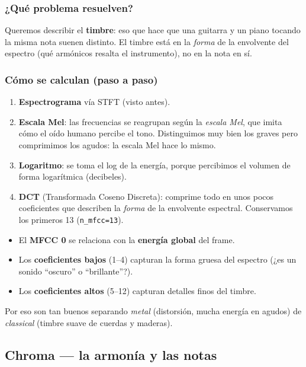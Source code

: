 \documentclass[11pt,a4paper]{article}
\newenvironment{ideabox}[1]{\begin{mdframed}[style=ideastyle,frametitle={#1}]}{\end{mdframed}}
\begin{document}
\subsubsection{¿Qué problema resuelven?}

Queremos describir el \textbf{timbre}: eso que hace que una guitarra y un piano
tocando la misma nota suenen distinto. El timbre está en la \emph{forma} de la
envolvente del espectro (qué armónicos resalta el instrumento), no en la nota en
sí.

\subsubsection{Cómo se calculan (paso a paso)}

\begin{enumerate}[leftmargin=0.8cm]
  \item \textbf{Espectrograma} vía STFT (visto antes).
  \item \textbf{Escala Mel}: las frecuencias se reagrupan según la
  \emph{escala Mel}, que imita cómo el oído humano percibe el tono. Distinguimos
  muy bien los graves pero comprimimos los agudos: la escala Mel hace lo mismo.
  \item \textbf{Logaritmo}: se toma el log de la energía, porque percibimos el
  volumen de forma logarítmica (decibeles).
  \item \textbf{DCT} (Transformada Coseno Discreta): comprime todo en unos pocos
  coeficientes que describen la \emph{forma} de la envolvente espectral.
  Conservamos los primeros 13 (\texttt{n\_mfcc=13}).
\end{enumerate}

\begin{ideabox}{Interpretación de los coeficientes}
\begin{itemize}[leftmargin=0.5cm]
  \item El \textbf{MFCC 0} se relaciona con la \textbf{energía global} del frame.
  \item Los \textbf{coeficientes bajos} (1--4) capturan la forma gruesa del
  espectro (¿es un sonido ``oscuro'' o ``brillante''?).
  \item Los \textbf{coeficientes altos} (5--12) capturan detalles finos del
  timbre.
\end{itemize}
Por eso son tan buenos separando \emph{metal} (distorsión, mucha energía en
agudos) de \emph{classical} (timbre suave de cuerdas y maderas).
\end{ideabox}

\subsection{Chroma --- la armonía y las notas}
\end{document}
